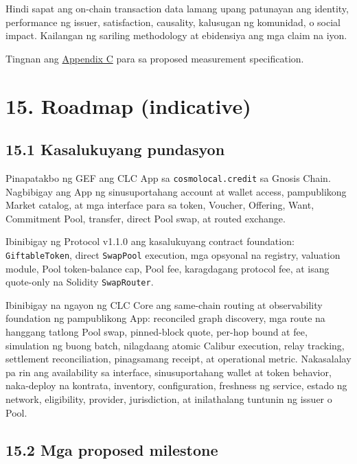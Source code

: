 \documentclass[11pt]{article}
\begin{document}
Hindi sapat ang on-chain transaction data lamang upang patunayan ang identity, performance ng issuer, satisfaction, causality, kalusugan ng komunidad, o social impact. Kailangan ng sariling methodology at ebidensiya ang mga claim na iyon.

Tingnan ang \href{https://docs.cosmolocal.credit/fil/white-paper/appendix-c-kpi-definitions}{Appendix C} para sa proposed measurement specification.


\section*{15. Roadmap (indicative)}

\subsection*{15.1 Kasalukuyang pundasyon}

Pinapatakbo ng GEF ang CLC App sa \texttt{cosmolocal.credit} sa Gnosis Chain. Nagbibigay ang App ng sinusuportahang account at wallet access, pampublikong Market catalog, at mga interface para sa token, Voucher, Offering, Want, Commitment Pool, transfer, direct Pool swap, at routed exchange.

Ibinibigay ng Protocol v1.1.0 ang kasalukuyang contract foundation: \texttt{GiftableToken}, direct \texttt{SwapPool} execution, mga opsyonal na registry, valuation module, Pool token-balance cap, Pool fee, karagdagang protocol fee, at isang quote-only na Solidity \texttt{SwapRouter}.

Ibinibigay na ngayon ng CLC Core ang same-chain routing at observability foundation ng pampublikong App: reconciled graph discovery, mga route na hanggang tatlong Pool swap, pinned-block quote, per-hop bound at fee, simulation ng buong batch, nilagdaang atomic Calibur execution, relay tracking, settlement reconciliation, pinagsamang receipt, at operational metric. Nakasalalay pa rin ang availability sa interface, sinusuportahang wallet at token behavior, naka-deploy na kontrata, inventory, configuration, freshness ng service, estado ng network, eligibility, provider, jurisdiction, at inilathalang tuntunin ng issuer o Pool.

\subsection*{15.2 Mga proposed milestone}
\end{document}

